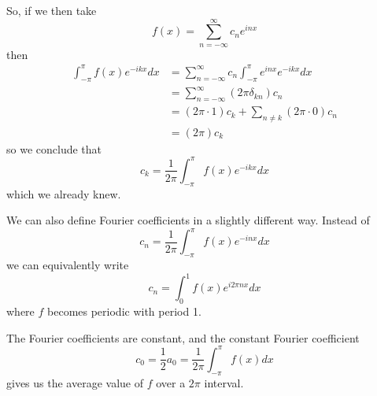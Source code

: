 So, if we then take
\begin{equation}
f(x) = \sum^{\infty}_{n=-\infty}c_{n}e^{inx}
\end{equation}
then
\begin{subequations}
\begin{align}
\int^{\pi}_{-\pi}f(x)e^{-ikx}dx &=
\sum^{\infty}_{n=-\infty}c_{n}\int^{\pi}_{-\pi}e^{inx}e^{-ikx}dx\\
&=\sum^{\infty}_{n=-\infty}(2\pi\delta_{kn})c_{n} \\
&=(2\pi\cdot1)c_{k} + \sum_{n\neq k}(2\pi\cdot 0)c_{n} \\
&=(2\pi)c_{k}
\end{align}
\end{subequations}
so we conclude that
\begin{equation}
c_{k} = \frac{1}{2\pi}\int^{\pi}_{-\pi}f(x)e^{-ikx}dx
\end{equation}
which we already knew.

\begin{rmk}
We can also define Fourier coefficients in a slightly
different way. Instead of
\begin{equation}
c_{n} = \frac{1}{2\pi}\int^{\pi}_{-\pi}f(x)e^{-inx}dx
\end{equation}
we can equivalently write
\begin{equation}
c_{n} = \int^{1}_{0}f(x)e^{i2\pi nx}dx
\end{equation}
where $f$ becomes periodic with period 1.
\end{rmk}
\begin{rmk}
The Fourier coefficients are constant, and the constant
Fourier coefficient 
$$ c_0 = \frac{1}{2}a_{0} =
\frac{1}{2\pi}\int^{\pi}_{-\pi}f(x)dx $$
gives us the average value of $f$ over a $2\pi$ interval.
\end{rmk}


